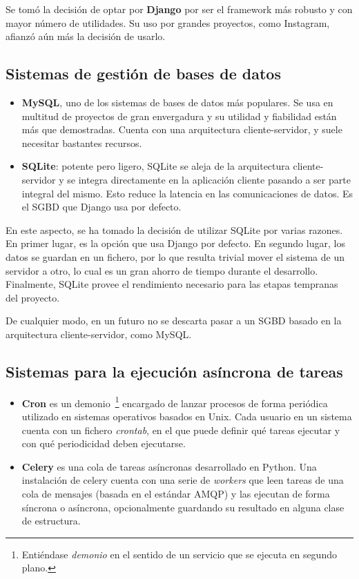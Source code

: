 Se tomó la decisión de optar por \textbf{Django} por ser el framework más
robusto y con mayor número de utilidades. Su uso por grandes proyectos, como
Instagram, afianzó aún más la decisión de usarlo.

\subsection{Sistemas de gestión de bases de datos}

\begin{itemize}
\item \textbf{MySQL}\cite{mysql}, uno de los sistemas de bases de datos más populares. Se
  usa en multitud de proyectos de gran envergadura y su utilidad y fiabilidad
  están más que demostradas. Cuenta con una arquitectura cliente-servidor, y
  suele necesitar bastantes recursos.

\item \textbf{SQLite}\cite{sqlite}: potente pero ligero, SQLite se aleja de la arquitectura
  cliente-servidor y se integra directamente en la aplicación cliente pasando a
  ser parte integral del mismo. Esto reduce la latencia en las comunicaciones de
  datos. Es el SGBD que Django usa por defecto.

\end{itemize}

En este aspecto, se ha tomado la decisión de utilizar SQLite por varias
razones. En primer lugar, es la opción que usa Django por defecto. En segundo
lugar, los datos se guardan en un fichero, por lo que resulta trivial mover el
sistema de un servidor a otro, lo cual es un gran ahorro de tiempo durante el
desarrollo. Finalmente, SQLite provee el rendimiento necesario para las etapas
tempranas del proyecto.

De cualquier modo, en un futuro no se descarta pasar a un SGBD basado en la
arquitectura cliente-servidor, como MySQL.

\subsection{Sistemas para la ejecución asíncrona de tareas}

\begin{itemize}
\item \textbf{Cron}\cite{cron} es un demonio~\footnote{Entiéndase \textit{demonio} en el
    sentido de un servicio que se ejecuta en segundo plano.} encargado de lanzar
  procesos de forma periódica utilizado en sistemas operativos basados en
  Unix. Cada usuario en un sistema cuenta con un fichero \textit{crontab}, en el
  que puede definir qué tareas ejecutar y con qué periodicidad deben ejecutarse. 

\item \textbf{Celery}\cite{celery} es una cola de tareas asíncronas desarrollado en
  Python. Una instalación de celery cuenta con una serie de \textit{workers} que
  leen tareas de una cola de mensajes (basada en el estándar \ac{AMQP}) y las
  ejecutan de forma síncrona o asíncrona, opcionalmente guardando su resultado
  en alguna clase de estructura. 

\end{itemize}

